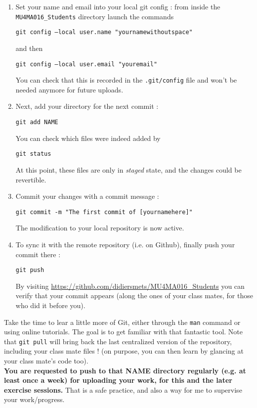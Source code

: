 \documentclass[a4paper,12pt]{article}
\begin{document}
\begin{enumerate}
	\item
		Set your name and email into your local git config : from inside
		the {\tt MU4MA016\_Students} directory launch the commands
		\begin{center}
		{\tt git config --local user.name "yournamewithoutspace"}
		\end{center}
		and then 
		\begin{center}
		{\tt git config --local user.email "youremail"}
		\end{center}
		You can check that this is recorded in the {\tt .git/config}
		file and won't be needed anymore for future uploads.
	\item Next, add your directory for the next commit :   
		\begin{center}
			{\tt git add NAME}
		\end{center}
		You can check which files were indeed added by
		\begin{center}
			{\tt git status}
		\end{center}
		At this point, these files are only in {\it staged} state, and
		the changes could be revertible.
	\item Commit your changes with a commit message :
		\begin{center}
			{\tt git commit -m "The first commit of [yournamehere]"}
		\end{center}
	      The modification to your local repository is now active.	
      \item To sync it with the remote repository (i.e. on Github), finally push 
	      your commit there :
		\begin{center}
			{\tt git push}
		\end{center}
	    By visiting \url{https://github.com/didiersmets/MU4MA016\_Students}
		you can verify that your commit appears (along the ones of your
		class mates, for those who did it before you).
\end{enumerate}
Take the time to lear a little more of Git, either through the {\tt man} command 
or using online tutorials. 
The goal is to get familiar with that fantastic tool. Note that {\tt git pull} 
will bring back the last centralized version of the repository, including your 
class mate files ! (on purpose, you can then learn by glancing at your class 
mate's code too).\\
{\bf You are requested to push to that NAME directory regularly (e.g. at least 
once a week) for uploading your work, for this and the later exercise sessions.} 
That is a safe practice, and also a way for me to supervise your work/progress.
\end{document}
